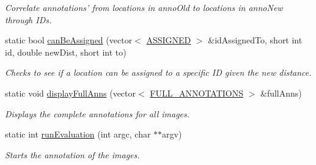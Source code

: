\begin{DoxyCompactItemize}
\begin{DoxyCompactList}\small\item\em Correlate annotations' from locations in {\ttfamily annoOld} to locations in {\ttfamily annoNew} through IDs. \item\end{DoxyCompactList}\item 
\hypertarget{classannotationsHandle_a82a7f09d712d49ea099b3e9c9ffc04c5}{
static bool \hyperlink{classannotationsHandle_a82a7f09d712d49ea099b3e9c9ffc04c5}{canBeAssigned} (vector$<$ \hyperlink{structannotationsHandle_1_1ASSIGNED}{ASSIGNED} $>$ \&idAssignedTo, short int id, double newDist, short int to)}
\label{classannotationsHandle_a82a7f09d712d49ea099b3e9c9ffc04c5}

\begin{DoxyCompactList}\small\item\em Checks to see if a location can be assigned to a specific ID given the new distance. \item\end{DoxyCompactList}\item 
\hypertarget{classannotationsHandle_a86d06efe7aa6e013a5739a625bed6726}{
static void \hyperlink{classannotationsHandle_a86d06efe7aa6e013a5739a625bed6726}{displayFullAnns} (vector$<$ \hyperlink{structannotationsHandle_1_1FULL__ANNOTATIONS}{FULL\_\-ANNOTATIONS} $>$ \&fullAnns)}
\label{classannotationsHandle_a86d06efe7aa6e013a5739a625bed6726}

\begin{DoxyCompactList}\small\item\em Displays the complete annotations for all images. \item\end{DoxyCompactList}\item 
static int \hyperlink{classannotationsHandle_ac3568b677d066530fd771952492293c3}{runEvaluation} (int argc, char $\ast$$\ast$argv)
\begin{DoxyCompactList}\small\item\em Starts the annotation of the images. \item\end{DoxyCompactList}\end{DoxyCompactItemize}


